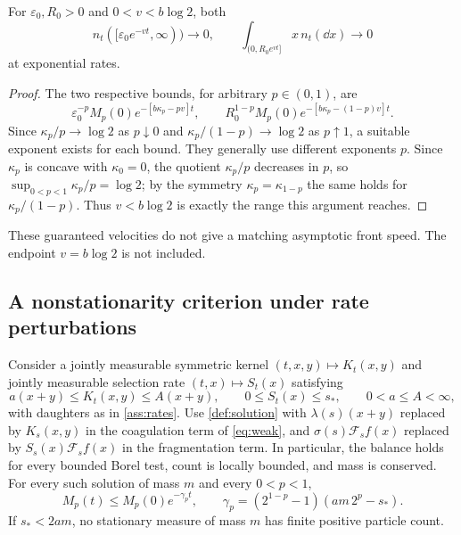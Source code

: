 \begin{corollary}\label{cor:moving}
For $\varepsilon_0,R_0>0$ and $0<v<b\log2$, both
\begin{equation}
 n_t([\varepsilon_0e^{-vt},\infty))\longrightarrow0,\qquad
 \int_{(0,R_0e^{vt}]}x\,n_t(\dd x)\longrightarrow0
 \label{eq:moving}
\end{equation}
at exponential rates.
\end{corollary}

\begin{proof}
The two respective bounds, for arbitrary $p\in(0,1)$, are
\[
 \varepsilon_0^{-p}M_p(0)e^{-[b\kappa_p-pv]t},\qquad
 R_0^{1-p}M_p(0)e^{-[b\kappa_p-(1-p)v]t}.
\]
Since $\kappa_p/p\to\log2$ as $p\downarrow0$ and
$\kappa_p/(1-p)\to\log2$ as $p\uparrow1$, a suitable exponent exists
for each bound. They generally use different exponents $p$.
Since $\kappa_p$ is concave with $\kappa_0=0$, the quotient $\kappa_p/p$
decreases in $p$, so $\sup_{0<p<1}\kappa_p/p=\log2$; by the symmetry
$\kappa_p=\kappa_{1-p}$ the same holds for $\kappa_p/(1-p)$. Thus
$v<b\log2$ is exactly the range this argument reaches.
\end{proof}

These guaranteed velocities do not give a matching asymptotic front
speed. The endpoint $v=b\log2$ is not included.

\subsection{A nonstationarity criterion under rate perturbations}

\begin{proposition}\label{prop:robust}
Consider a jointly measurable symmetric kernel $(t,x,y)\mapsto K_t(x,y)$
and jointly measurable selection rate $(t,x)\mapsto S_t(x)$ satisfying
\begin{equation}
 a(x+y)\leq K_t(x,y)\leq A(x+y),\qquad
 0\leq S_t(x)\leq s_*,\qquad 0<a\leq A<\infty,
 \label{eq:robust-assumptions}
\end{equation}
with daughters as in \cref{ass:rates}. Use \cref{def:solution} with
$\lambda(s)(x+y)$ replaced by $K_s(x,y)$ in the coagulation term of
\eqref{eq:weak}, and $\sigma(s)\mathcal F_s f(x)$ replaced by
$S_s(x)\mathcal F_s f(x)$ in the fragmentation term. In particular, the
balance holds for every bounded Borel test, count is locally bounded,
and mass is conserved. For every such solution of mass $m$ and every
$0<p<1$,
\begin{equation}
 M_p(t)\leq M_p(0)e^{-\gamma_p t},\qquad
 \gamma_p=(2^{1-p}-1)(am\,2^p-s_*).
 \label{eq:robust}
\end{equation}
If $s_*<2am$, no stationary measure of mass $m$ has finite positive
particle count.
\end{proposition}

